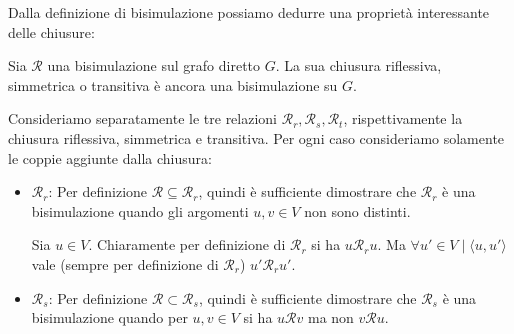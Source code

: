 Dalla definizione di bisimulazione possiamo dedurre una proprietà interessante delle chiusure:
\begin{theorem}
    Sia $\mathcal{R}$ una bisimulazione sul grafo diretto $G$. La sua chiusura riflessiva, simmetrica o transitiva è ancora una bisimulazione su $G$.
    \label{theo:bisi_chiusura}
\end{theorem}
\begin{proof2}
    Consideriamo separatamente le tre relazioni $\mathcal{R}_r, \mathcal{R}_s, \mathcal{R}_t$, rispettivamente la chiusura riflessiva, simmetrica e transitiva. Per ogni caso consideriamo solamente le coppie aggiunte dalla chiusura:
    \begin{itemize}
        \item $\mathcal{R}_r$: Per definizione $\mathcal{R} \subseteq \mathcal{R}_r$, quindi è sufficiente dimostrare che $\mathcal{R}_r$ è una bisimulazione quando gli argomenti $u,v \in V$ non sono distinti.

        Sia $u \in V$. Chiaramente per definizione di $\mathcal{R}_r$ si ha $u \mathcal{R}_r u$. Ma $\forall u' \in V \mid \langle u, u' \rangle$ vale (sempre per definizione di $\mathcal{R}_r$) $u' \mathcal{R}_r u'$.
        \item $\mathcal{R}_s$: Per definizione $\mathcal{R} \subset \mathcal{R}_s$, quindi è sufficiente dimostrare che $\mathcal{R}_s$ è una bisimulazione quando per $u,v \in V$ si ha $u \mathcal{R} v$ ma non $v \mathcal{R} u$.


\end{itemize}
\end{proof2}
